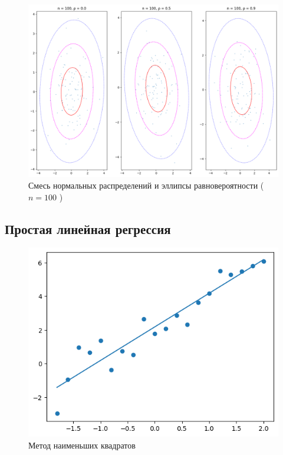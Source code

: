 \documentclass[12pt,a4paper]{article}
\begin{document}
	\begin{figure}[htbp!]
		\begin{center}
			\includegraphics[width = 0.8\linewidth]{graphics/lab5_ellips_100}
			\caption{Смесь нормальных распределений и эллипсы равновероятности
			( \( n = 100 \) )}
		\end{center}
	\end{figure}

	\clearpage

	\subsection{Простая линейная регрессия}

	\begin{figure}[htbp!]
		\begin{center}
			\includegraphics[width = 1\linewidth]{graphics/lab6_sq}
			\caption{Метод наименьших квадратов}
		\end{center}
	\end{figure}
\end{document}
